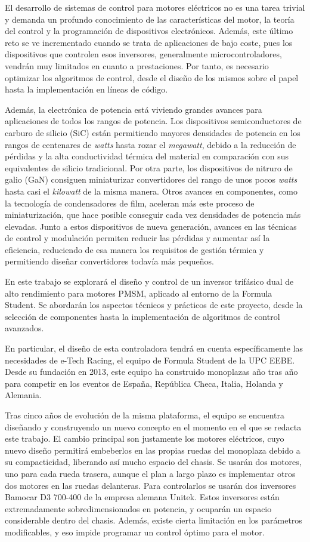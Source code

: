 El desarrollo de sistemas de control para motores eléctricos no es una tarea trivial y demanda un profundo conocimiento de las características del motor, la teoría del control y la programación de dispositivos electrónicos. Además, este último reto se ve incrementado cuando se trata de aplicaciones de bajo coste, pues los dispositivos que controlen esos inversores, generalmente microcontroladores, vendrán muy limitados en cuanto a prestaciones. Por tanto, es necesario optimizar los algoritmos de control, desde el diseño de los mismos sobre el papel hasta la implementación en líneas de código.

Además, la electrónica de potencia está viviendo grandes avances para aplicaciones de todos los rangos de potencia. Los dispositivos semiconductores de carburo de silicio (SiC) están permitiendo mayores densidades de potencia en los rangos de centenares de \textit{watts} hasta rozar el \textit{megawatt}, debido a la reducción de pérdidas y la alta conductividad térmica del material en comparación con sus equivalentes de silicio tradicional. Por otra parte, los dispositivos de nitruro de galio (GaN) consiguen miniaturizar convertidores del rango de unos pocos \textit{watts} hasta casi el \textit{kilowatt} de la misma manera. Otros avances en componentes, como la tecnología de condensadores de film, aceleran más este proceso de miniaturización, que hace posible conseguir cada vez densidades de potencia más elevadas. Junto a estos dispositivos de nueva generación, avances en las técnicas de control y modulación permiten reducir las pérdidas y aumentar así la eficiencia, reduciendo de esa manera los requisitos de gestión térmica y permitiendo diseñar convertidores todavía más pequeños.

En este trabajo se explorará el diseño y control de un inversor trifásico dual de alto rendimiento para motores PMSM, aplicado al entorno de la Formula Student. Se abordarán los aspectos técnicos y prácticos de este proyecto, desde la selección de componentes hasta la implementación de algoritmos de control avanzados.

En particular, el diseño de esta controladora tendrá en cuenta específicamente las necesidades de e-Tech Racing, el equipo de Formula Student de la UPC EEBE. Desde su fundación en 2013, este equipo ha construido monoplazas año tras año para competir en los eventos de España, República Checa, Italia, Holanda y Alemania.

Tras cinco años de evolución de la misma plataforma, el equipo se encuentra diseñando y construyendo un nuevo concepto en el momento en el que se redacta este trabajo. El cambio principal son justamente los motores eléctricos, cuyo nuevo diseño permitirá embeberlos en las propias ruedas del monoplaza debido a su compacticidad, liberando así mucho espacio del chasis. Se usarán dos motores, uno para cada rueda trasera, aunque el plan a largo plazo es implementar otros dos motores en las ruedas delanteras. Para controlarlos se usarán dos inversores Bamocar D3 700-400 de la empresa alemana Unitek. Estos inversores están extremadamente sobredimensionados en potencia, y ocuparán un espacio considerable dentro del chasis. Además, existe cierta limitación en los parámetros modificables, y eso impide programar un control óptimo para el motor.

